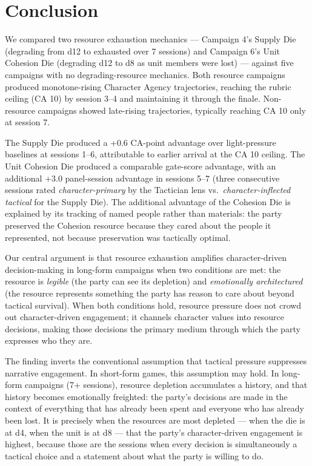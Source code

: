 
\section{Conclusion}
\label{sec:conclusion}

We compared two resource exhaustion mechanics --- Campaign 4's Supply Die
(degrading from d12 to exhausted over 7 sessions) and Campaign 6's Unit Cohesion
Die (degrading d12 to d8 as unit members were lost) --- against five campaigns with
no degrading-resource mechanics. Both resource campaigns produced monotone-rising
Character Agency trajectories, reaching the rubric ceiling (CA 10) by session 3--4
and maintaining it through the finale. Non-resource campaigns showed late-rising
trajectories, typically reaching CA 10 only at session 7.

The Supply Die produced a +0.6 CA-point advantage over light-pressure baselines
at sessions 1--6, attributable to earlier arrival at the CA 10 ceiling. The Unit
Cohesion Die produced a comparable gate-score advantage, with an additional +3.0
panel-session advantage in sessions 5--7 (three consecutive sessions rated
\textit{character-primary} by the Tactician lens vs.\ \textit{character-inflected
tactical} for the Supply Die). The additional advantage of the Cohesion Die is
explained by its tracking of named people rather than materials: the party preserved
the Cohesion resource because they cared about the people it represented, not because
preservation was tactically optimal.

Our central argument is that resource exhaustion amplifies character-driven
decision-making in long-form campaigns when two conditions are met: the resource
is \textit{legible} (the party can see its depletion) and \textit{emotionally
architectured} (the resource represents something the party has reason to care about
beyond tactical survival). When both conditions hold, resource pressure does not
crowd out character-driven engagement; it channels character values into resource
decisions, making those decisions the primary medium through which the party expresses
who they are.

The finding inverts the conventional assumption that tactical pressure suppresses
narrative engagement. In short-form games, this assumption may hold. In long-form
campaigns (7+ sessions), resource depletion accumulates a history, and that history
becomes emotionally freighted: the party's decisions are made in the context of
everything that has already been spent and everyone who has already been lost.
It is precisely when the resources are most depleted --- when the die is at d4,
when the unit is at d8 --- that the party's character-driven engagement is highest,
because those are the sessions when every decision is simultaneously a tactical
choice and a statement about what the party is willing to do.

